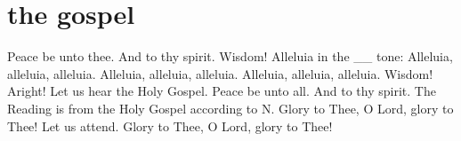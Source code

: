 \section{the gospel}

\begin{liturgicaltext}
    \priest Peace be unto thee.
    \reader And to thy spirit.
    \deacon Wisdom!
    \reader Alleluia in the \_\_ tone: 
    \choir Alleluia, alleluia, alleluia.
    \reader {}
    \choir Alleluia, alleluia, alleluia.
    \reader {}
    \choir Alleluia, alleluia, alleluia.
    \deacon Wisdom! Aright! Let us hear the Holy Gospel.
    \priest Peace be unto all.
    \choir And to thy spirit.
    \deacon The Reading is from the Holy Gospel according to N.
    \choir Glory to Thee, O Lord, glory to Thee!
    \priest Let us attend.
    \deacon {}
    \choir Glory to Thee, O Lord, glory to Thee!
\end{liturgicaltext}